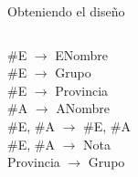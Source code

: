 \begin{frame}{Obteniendo el dise\~no}
    \begin{columns}[T]
        \begin{column}{0.3\linewidth}
            \#E $\to$ ENombre\\
            {
            \#E $\to$ Grupo\\}
            \#E $\to$ Provincia\\
            \#A $\to$ ANombre\\
            \#E, \#A $\to$ \#E, \#A\\
            \#E, \#A $\to$ Nota\\
            Provincia $\to$ Grupo
        \end{column}

        \begin{column}{0.3\linewidth}
        \end{column}
        
    \end{columns}
    \vspace{5mm}
\end{frame}


